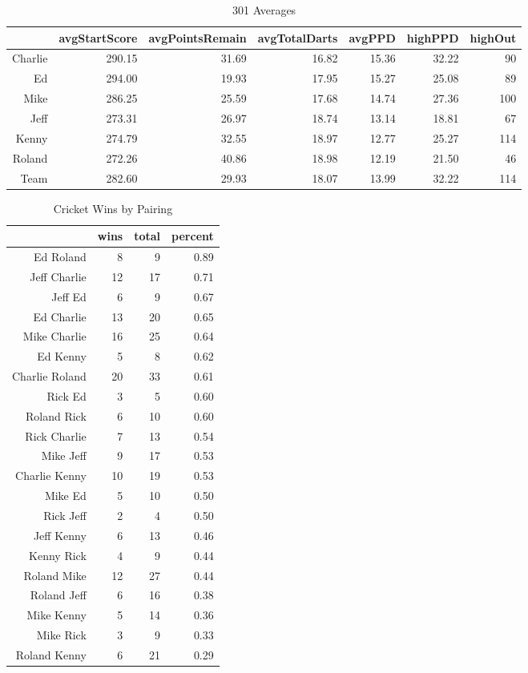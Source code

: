 \documentclass{article}\usepackage{graphicx, color}
\begin{document}
\begin{table}[ht]
\centering
\caption{301 Averages} 
\begin{tabular}{rrrrrrr}
  \hline
 & avgStartScore & avgPointsRemain & avgTotalDarts & avgPPD & highPPD & highOut \\ 
  \hline
Charlie & 290.15 & 31.69 & 16.82 & 15.36 & 32.22 &  90 \\ 
  Ed & 294.00 & 19.93 & 17.95 & 15.27 & 25.08 &  89 \\ 
  Mike & 286.25 & 25.59 & 17.68 & 14.74 & 27.36 & 100 \\ 
  Jeff & 273.31 & 26.97 & 18.74 & 13.14 & 18.81 &  67 \\ 
  Kenny & 274.79 & 32.55 & 18.97 & 12.77 & 25.27 & 114 \\ 
  Roland & 272.26 & 40.86 & 18.98 & 12.19 & 21.50 &  46 \\ 
  Team & 282.60 & 29.93 & 18.07 & 13.99 & 32.22 & 114 \\ 
   \hline
\end{tabular}
\end{table}


\begin{table}[ht]
\centering
\caption{Cricket Wins by Pairing} 
\begin{tabular}{rrrr}
  \hline
 & wins & total & percent \\ 
  \hline
Ed Roland &   8 &   9 & 0.89 \\ 
  Jeff Charlie &  12 &  17 & 0.71 \\ 
  Jeff Ed &   6 &   9 & 0.67 \\ 
  Ed Charlie &  13 &  20 & 0.65 \\ 
  Mike Charlie &  16 &  25 & 0.64 \\ 
  Ed Kenny &   5 &   8 & 0.62 \\ 
  Charlie Roland &  20 &  33 & 0.61 \\ 
  Rick Ed &   3 &   5 & 0.60 \\ 
  Roland Rick &   6 &  10 & 0.60 \\ 
  Rick Charlie &   7 &  13 & 0.54 \\ 
  Mike Jeff &   9 &  17 & 0.53 \\ 
  Charlie Kenny &  10 &  19 & 0.53 \\ 
  Mike Ed &   5 &  10 & 0.50 \\ 
  Rick Jeff &   2 &   4 & 0.50 \\ 
  Jeff Kenny &   6 &  13 & 0.46 \\ 
  Kenny Rick &   4 &   9 & 0.44 \\ 
  Roland Mike &  12 &  27 & 0.44 \\ 
  Roland Jeff &   6 &  16 & 0.38 \\ 
  Mike Kenny &   5 &  14 & 0.36 \\ 
  Mike Rick &   3 &   9 & 0.33 \\ 
  Roland Kenny &   6 &  21 & 0.29 \\ 
   \hline
\end{tabular}
\end{table}
\end{document}
